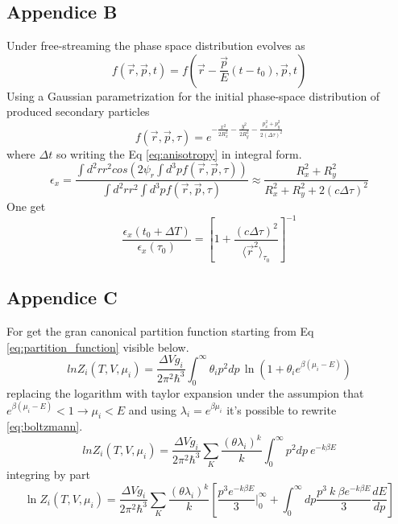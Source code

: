 \documentclass[12pt,a4paper]{book}
\begin{document}
	\subsection{Appendice B}
	Under free-streaming the phase space distribution evolves as
	\begin{equation}
		f(\vec{r},\vec{p}, t) = f(\vec{r} - \frac{\vec{p}}{E}(t-t_0), \vec{p}, t) 
	\end{equation}
	Using a Gaussian parametrization for the initial phase-space distribution of produced secondary particles
	\begin{equation}
		f(\vec{r},\vec{p}, \tau) =e^{- \frac{x^2}{2 R_x^2} - \frac{y^2}{2 R_y^2}- \frac{p_x^2+ p_y^2}{2 (\Delta \tau)^2}}
	\end{equation}
	where $\Delta t$ so writing the Eq \ref{eq:anisotropy} in integral form.
	\begin{equation}
		\epsilon_x = \frac{\int d^2 r r^2 cos(2 \psi_r \int d^3 p f(\vec{r},\vec{p}, \tau))}{\int d^2 r r^2  \int d^3 p f(\vec{r},\vec{p}, \tau)} \approx \frac{R_x^2 +R_y^2}{R_x^2 +R_y^2 + 2(c \Delta \tau)^2}
	\end{equation}
	One get
	\begin{equation}
		\frac{\epsilon_x(t_0 + \Delta T)}{\epsilon_x(\tau_0)} = \left[ 1 + \frac{(c \Delta \tau)^2}{\langle \vec{r}^2 \rangle_{\tau_0}} \right]^{-1}
	\end{equation}
	
	\subsection{Appendice C}
	For get the gran canonical partition function starting from Eq \ref{eq:partition_function} visible below.
	\begin{equation}
		ln Z_i(T,V,\mu_i)= \frac{\Delta V g_i}{2\pi^2\hbar^3} \int_{0}^{\infty} \theta_i p^2 dp \,  \ln(1+\theta_i e^{\beta(\mu_i-E)})
	\end{equation}
	replacing the logarithm with taylor expansion under the assumpion that $e^{\beta(\mu_i-E)} < 1 \rightarrow \mu_i < E$ and using $\lambda_i= e^{\beta \mu_i}$ it's possible to rewrite \ref{eq:boltzmann}.
	\begin{equation}
		ln Z_i(T,V,\mu_i)= \frac{\Delta V g_i}{2\pi^2\hbar^3} \sum_{K} \frac{(\theta \lambda_i)^k}{k} \int_{0}^{\infty} p^2 dp \  e^{-k \beta E}
	\end{equation}
	integring by part
	\begin{equation}
		\ln Z_i(T,V,\mu_i) = \frac{\Delta V g_i}{2\pi^2\hbar^3} \sum_{K} \frac{(\theta \lambda_i)^k}{k} \left[\frac{p^3 e^{-k \beta E}}{3} \Big|_0^\infty + \int_{0}^{\infty} dp \frac{p^3 \  k \  \beta e^{-k \beta E}}{3} \frac{dE}{dp} \right]
	\end{equation}
	
\end{document}
